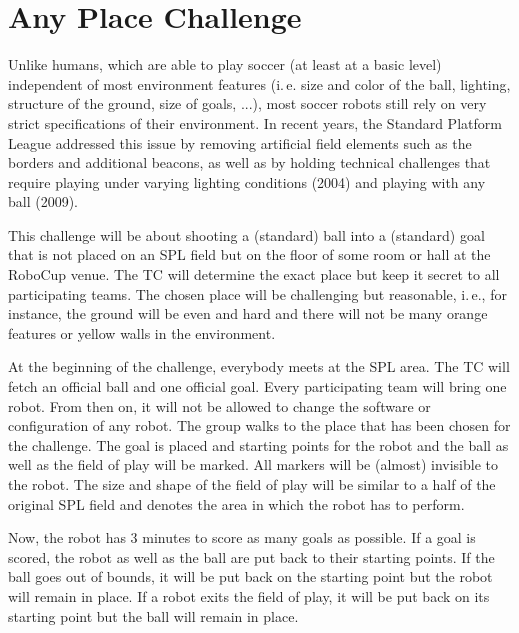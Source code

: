 \documentclass[12pt]{article}
\newcommand{\ie}{\mbox{i.\,e.}\xspace}
\begin{document}
\newpage






\section{Any Place Challenge}

Unlike humans, which are able to play soccer (at least at a basic level) independent of most environment features (\ie size and color of the ball, lighting, structure of the ground, size of goals, ...), most soccer robots still rely on very strict specifications of their environment. In recent years, the Standard Platform League addressed this issue by removing artificial field elements such as the borders and additional beacons, as well as by holding technical challenges that require playing under varying lighting conditions (2004) and playing with any ball (2009).

This challenge will be about shooting a (standard) ball into a (standard) goal that is not placed on an SPL field but on the floor of some room or hall at the RoboCup venue. The TC will determine the exact place but keep it secret to all participating teams. The chosen place will be challenging but reasonable, \ie, for instance, the ground will be even and hard and there will not be many orange features or yellow walls in the environment.

At the beginning of the challenge, everybody meets at the SPL area. The TC will fetch an official ball and one official goal. Every participating team will bring one robot. From then on, it will not be allowed to change the software or configuration of any robot. The group walks to the place that has been chosen for the challenge. The goal is placed and starting points for the robot and the ball as well as the field of play will be marked. All markers will be (almost) invisible to the robot. The size and shape of the field of play will be similar to a half of the original SPL field and denotes the area in which the robot has to perform.

Now, the robot has 3 minutes to score as many goals as possible. If a goal is scored, the robot as well as the ball are put back to their starting points. If the ball goes out of bounds, it will be put back on the starting point but the robot will remain in place. If a robot exits the field of play, it will be put back on its starting point but the ball will remain in place.
\end{document}
